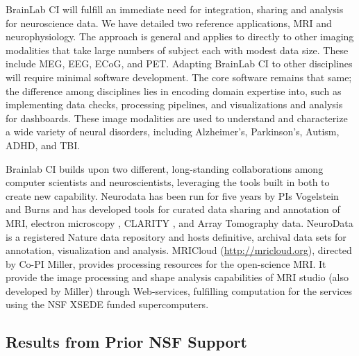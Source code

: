 
BrainLab CI will fulfill an immediate need for integration, sharing and analysis for neuroscience data.
We have detailed two reference applications, MRI and neurophysiology.
The approach is general and applies to directly to other imaging modalities that take 
large numbers of subject each with modest data size.  These include MEG, EEG, ECoG, and PET.
Adapting BrainLab CI to other disciplines will require minimal software development. 
The core software remains that same; the difference among disciplines lies in encoding
domain expertise into, such as implementing data checks, processing pipelines, and
visualizations and analysis for dashboards.  These image modalities are used to understand 
and characterize a wide variety of neural disorders, including Alzheimer's, Parkinson's,
Autism, ADHD, and TBI.  


Brainlab CI builds upon two different, long-standing collaborations among 
computer scientists and neuroscientists, leveraging the tools built in both to create
new capability.  Neurodata has been run for five years by PIs Vogelstein and Burns
and has developed tools for curated data sharing and annotation of MRI, electron microscopy \cite{harris15}, 
CLARITY \cite{Chung2013a}, and Array Tomography \cite{weiler14} data.  NeuroData is a registered Nature data repository 
and hosts definitive, archival data sets for annotation, visualization and analysis.
MRICloud (\url{http://mricloud.org}), directed by Co-PI Miller, provides processing 
resources for the open-science MRI.  It provide the image processing and shape analysis 
capabilities of MRI studio 
(also developed by Miller) through Web-services, fulfilling computation for the services using 
the NSF XSEDE funded supercomputers.  


\subsection{Results from Prior NSF Support}




